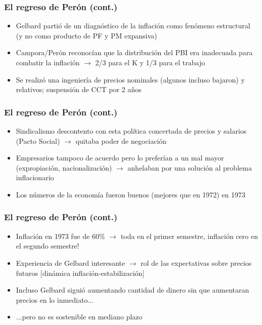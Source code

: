 \documentclass[14pt,aspectratio=169]{beamer}
\begin{document}
  
\begin{frame}\frametitle{El regreso de Perón (cont.)}
                 \begin{itemize}\itemsep 5pt \medskip
                 \item Gelbard partió de un diagnóstico de la
                   inflación como fenómeno estructural (y no como
                   producto de PF y PM expansiva)
                   \item Campora/Perón reconocían que la distribución
                     del PBI era inadecuada para combatir la inflación
                     $\longrightarrow$ 2/3 para el K y 1/3 para el
                     trabajo
                     \item Se realizó una ingeniería de precios
                       nominales (algunos incluso bajaron) y
                       relativos; suspensión de CCT por 2 años
                 \end{itemize}
               \end{frame}


               \begin{frame}\frametitle{El regreso de Perón (cont.)}
                 \begin{itemize}\itemsep 5pt \medskip
                 \item Sindicalismo descontento con esta política
                   concertada de precios y salarios (Pacto Social) $\longrightarrow$
                   quitaba poder de negociación
                   \item Empresarios tampoco de acuerdo pero lo
                     preferían a un mal mayor (expropiación, nacionalización)
                     $\longrightarrow$ anhelaban por una solución al
                     problema inflacionario
                     \item Los números de la economía fueron buenos
                       (mejores que en 1972) en 1973
                 \end{itemize}
               \end{frame}



                \begin{frame}\frametitle{El regreso de Perón (cont.)}
                 \begin{itemize}\itemsep 5pt \medskip
                 \item Inflación en 1973 fue de 60\% $\longrightarrow$
                   toda en el primer semestre, inflación cero en el
                   segundo semestre!
                   \item Experiencia de Gelbard interesante
                     $\longrightarrow$ rol de las expectativas sobre
                     precios futuros [dinámica inflación-estabilización]
                     \item Incluso Gelbard siguió aumentando cantidad
                       de dinero sin que aumentaran precios en lo
                       inmediato...
                       \item ...pero no es sostenible en mediano plazo
                 \end{itemize}
               \end{frame}
\end{document}
